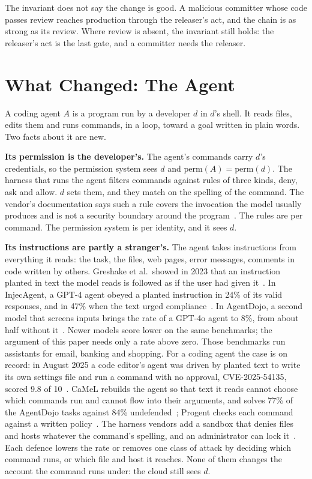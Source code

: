 \documentclass[11pt]{article}
\theoremstyle{definition}
\begin{document}
The invariant does not say the change is good. A malicious committer whose code passes review reaches production through the releaser's act, and the chain is as strong as its review. Where review is absent, the invariant still holds: the releaser's act is the last gate, and a committer needs the releaser.

\section{What Changed: The Agent}
\label{sec:agent}

A coding agent $A$ is a program run by a developer $d$ in $d$'s shell. It reads files, edits them and runs commands, in a loop, toward a goal written in plain words. Two facts about it are new.

\textbf{Its permission is the developer's.} The agent's commands carry $d$'s credentials, so the permission system sees $d$ and $\mathrm{perm}(A) = \mathrm{perm}(d)$. The harness that runs the agent filters commands against rules of three kinds, deny, ask and allow. $d$ sets them, and they match on the spelling of the command. The vendor's documentation says such a rule covers the invocation the model usually produces and is not a security boundary around the program~\cite{ClaudeCodePermissions}. The rules are per command. The permission system is per identity, and it sees $d$.

\textbf{Its instructions are partly a stranger's.} The agent takes instructions from everything it reads: the task, the files, web pages, error messages, comments in code written by others. Greshake et al.\ showed in 2023 that an instruction planted in text the model reads is followed as if the user had given it~\cite{Greshake}. In InjecAgent, a GPT-4 agent obeyed a planted instruction in 24\% of its valid responses, and in 47\% when the text urged compliance~\cite{InjecAgent}. In AgentDojo, a second model that screens inputs brings the rate of a GPT-4o agent to 8\%, from about half without it~\cite{AgentDojo}. Newer models score lower on the same benchmarks; the argument of this paper needs only a rate above zero. Those benchmarks run assistants for email, banking and shopping. For a coding agent the case is on record: in August 2025 a code editor's agent was driven by planted text to write its own settings file and run a command with no approval, CVE-2025-54135, scored 9.8 of 10~\cite{CVECursor}. CaMeL rebuilds the agent so that text it reads cannot choose which commands run and cannot flow into their arguments, and solves 77\% of the AgentDojo tasks against 84\% undefended~\cite{CaMeL}; Progent checks each command against a written policy~\cite{Progent}. The harness vendors add a sandbox that denies files and hosts whatever the command's spelling, and an administrator can lock it~\cite{ClaudeCodePermissions}. Each defence lowers the rate or removes one class of attack by deciding which command runs, or which file and host it reaches. None of them changes the account the command runs under: the cloud still sees $d$.
\end{document}
